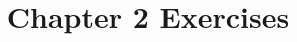 \documentclass{ximera}
\title{Chapter 2 Exercises}
\providecommand\practice[2][]{}
\begin{document}
\begin{abstract}
\end{abstract}
\maketitle

\practice{practiceOne}
\practice{practiceTwo}
\end{document}
